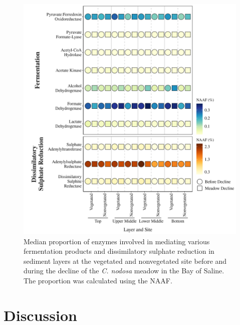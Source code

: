 \documentclass[
  12 pt,
]{article}
\begin{document}
\begin{figure}[H]

{\centering \includegraphics[width=0.9\linewidth]{../results/figures/heatmap_fermentation_dsr} 

}

\caption{Median proportion of enzymes involved in mediating various fermentation products and dissimilatory sulphate reduction in sediment layers at the vegetated and nonvegetated site before and during the decline of the \emph{C. nodosa} meadow in the Bay of Saline. The proportion was calculated using the NAAF.}\label{fig:heatmap-fermentation-dsr}
\end{figure}

\newpage

\hypertarget{discussion}{%
\section{Discussion}\label{discussion}}
\end{document}
